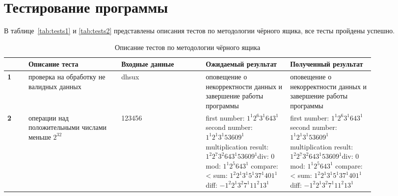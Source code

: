 \section{Тестирование программы}
В таблице~\ref{tab:tests1} и \ref{tab:tests2} представлены описания тестов по методологии чёрного ящика, все тесты пройдены успешно.
\begin{table}[htbp]
	\centering
	\caption{Описание тестов по методологии чёрного ящика}
	\begin{tabular}{|p{0.05\linewidth}|p{0.22\linewidth}|p{0.2\linewidth}|p{0.2\linewidth}|p{0.2\linewidth}|}
		\hline
		& \textbf{Описание теста} & \textbf{Входные данные} & \textbf{Ожидаемый результат} & \textbf{Полученный результат} \\
		\hline
		
		\textbf{1} 
		& проверка на обработку не валидных данных 
		& dhsux
		& оповещение о некорректности данных и завершение работы программы 
		& оповещение о некорректности данных и завершение работы программы  \\
		\hline
		
		\textbf{2} 
		& операции над положительными числами меньше $2^{32}$
		& 123456 \newline 321654
		& first number: $1^1 2^6 3^1 643^1$\newline second number: $1^1 2^1 3^1 53609^1$ \newline
		multiplication result: $1^2 2^7 3^2 643^1 53609^1$\newline div: 0 \newline
		mod: $1^1 2^5 643^1$ \newline
		compare: < \newline
		sum: $1^2 2^1 3^1 5^1 37^1 401^1$\newline
		diff: $- 1^2 2^1 3^2 7^1 11^2 13^1$\newline
		& first number: $1^1 2^6 3^1 643^1$\newline second number: $1^1 2^1 3^1 53609^1$ \newline
		multiplication result: $1^2 2^7 3^2 643^1 53609^1$\newline div: 0 \newline
		mod: $1^1 2^5 643^1$ \newline
		compare: < \newline
		sum: $1^2 2^1 3^1 5^1 37^1 401^1$\newline
		diff: $- 1^2 2^1 3^2 7^1 11^2 13^1$\newline \\
		\hline
		

\end{tabular}
\end{table}
